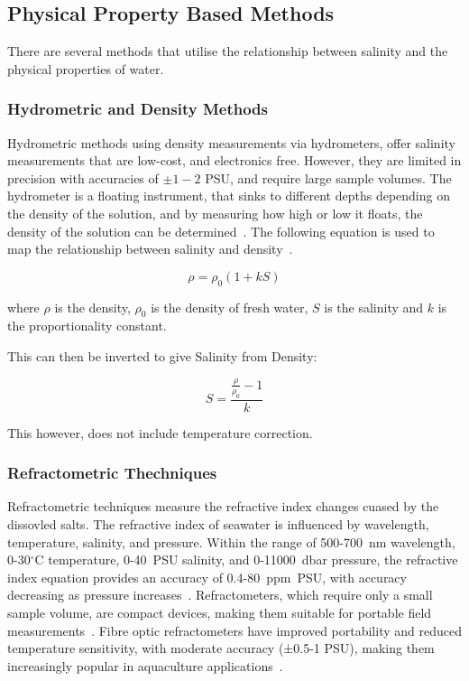 \subsection{Physical Property Based Methods}
There are several methods that utilise the relationship between salinity and the physical properties of water.

\subsubsection{Hydrometric and Density Methods}
Hydrometric methods using density measurements via hydrometers, offer salinity measurements that are low-cost, and electronics free. 
However, they are limited in precision with accuracies of $\pm 1-2$ PSU, and require large sample volumes.
The hydrometer is a floating instrument, that sinks to different depths depending on the density of the solution, and by measuring how high or low it floats, the density of the solution can be determined~\cite{the_globe_program_hydrometer}.
The following equation is used to map the relationship between salinity and density~\cite{kjerfve_density}.

\begin{equation}
    \rho = \rho_0(1+kS)
\end{equation}

where $\rho$ is the density, $\rho_0$ is the density of fresh water, $S$ is the salinity and $k$ is the proportionality constant. 

This can then be inverted to give Salinity from Density:

\begin{equation}
S = \frac{\frac{\rho}{\rho_0}-1}{k}
\end{equation}

This however, does not include temperature correction.

\subsubsection{Refractometric Thechniques}
Refractometric techniques measure the refractive index changes cuased by the dissovled salts.
The refractive index of seawater is influenced by wavelength, temperature, salinity, and pressure. 
Within the range of 500-700~nm wavelength, 0-30$^\circ$C temperature, 0-40~PSU salinity, and 0-11000~dbar pressure, the refractive index equation provides an accuracy of 0.4-80~ppm~PSU, with accuracy decreasing as pressure increases~\cite{refraction_millard}.
Refractometers, which require only a small sample volume, are compact devices, making them suitable for portable field measurements~\cite{malarde_high-resolution_refractometer}.
Fibre optic refractometers have improved portability and reduced temperature sensitivity, with moderate accuracy (±0.5-1 PSU), making them increasingly popular in aquaculture applications~\cite{zhang_high-temperature_fibre}. 


